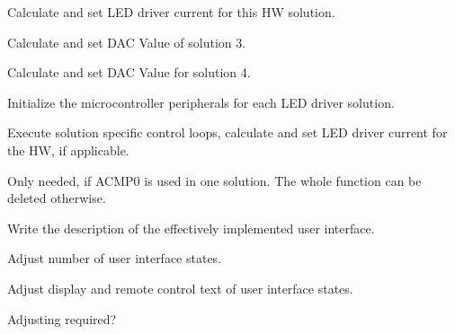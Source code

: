 \begin{DoxyRefList}
\label{todo__todo000010}%
%
Calculate and set L\+ED driver current for this HW solution. 

\label{todo__todo000011}%
%
Calculate and set D\+AC Value of solution 3. 

\label{todo__todo000012}%
%
Calculate and set D\+AC Value for solution 4.  
\item[Global \mbox{\hyperlink{power_l_e_ds_8c_a2645a97196e2d49cae6faa63771813b8}{P\+W\+R\+\_\+init}} (void)]\label{todo__todo000013}%
%
Initialize the microcontroller peripherals for each L\+ED driver solution.  
\item[Global \mbox{\hyperlink{power_l_e_ds_8c_a5f89e5f7418d3a10f49b2faeab3711dd}{T\+I\+M\+E\+R0\+\_\+\+I\+R\+Q\+Handler}} (void)]\label{todo__todo000014}%
%
Execute solution specific control loops, calculate and set L\+ED driver current for the HW, if applicable.  
\item[Global \mbox{\hyperlink{power_l_e_ds_8c_ab02f5d4daeb91b35fbca3abdd48d4999}{P\+W\+R\+\_\+\+A\+C\+M\+P\+\_\+\+I\+R\+Q\+Handler}} (void)]\label{todo__todo000015}%
%
Only needed, if A\+C\+M\+P0 is used in one solution. The whole function can be deleted otherwise.  
\item[File \mbox{\hyperlink{userinterface_8c}{userinterface.c}} ]\label{todo__todo000016}%
%
Write the description of the effectively implemented user interface. 
\item[Global \mbox{\hyperlink{userinterface_8c_a217d6d63166032f1370ddc68471be9b7}{U\+I\+\_\+\+S\+T\+A\+T\+E\+\_\+\+C\+O\+U\+NT}} ]\label{todo__todo000017}%
%
Adjust number of user interface states.  
\item[Global \mbox{\hyperlink{userinterface_8c_a9d9e7740b3f83ae8837fc1127fe34c19}{U\+I\+\_\+text}} \mbox{[}U\+I\+\_\+\+S\+T\+A\+T\+E\+\_\+\+C\+O\+U\+NT\mbox{]}]\label{todo__todo000018}%
%
Adjust display and remote control text of user interface states.  
\item[Global \mbox{\hyperlink{userinterface_8c_a3b5d5c55f6a1a5f034ddba502d98ef12}{U\+I\+\_\+\+T\+E\+X\+T\+\_\+\+C\+O\+M\+P\+A\+R\+E\+\_\+\+L\+E\+N\+G\+TH}} ]\label{todo__todo000019}%
%
Adjusting required?  
\item[Global \mbox{\hyperlink{userinterface_8c_aa9025a1123214371cc7f6a5bd90da00e}{U\+I\+\_\+state\+\_\+t}} ]\label{todo__todo000020}%

\end{DoxyRefList}
